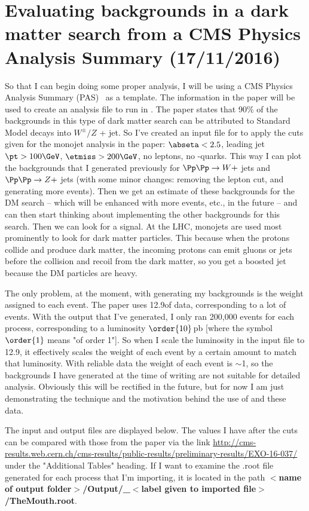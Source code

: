 
\chapter{Evaluating backgrounds in a dark matter search from a CMS Physics Analysis Summary (17/11/2016)}

So that I can begin doing some proper analysis, I will be using a CMS Physics Analysis Summary (PAS)~\cite{CMS:2016pod} as a template. The information in the paper will be used to create an analysis file to run in \madanalysis. The paper states that 90\% of the backgrounds in this type of dark matter search can be attributed to Standard Model decays into $W^{\pm} / Z$ + jet. So I've created an input file for \madanalysis to apply the cuts given for the monojet analysis in the paper: $\abseta < 2.5$, leading jet $\pt > 100\GeV$, $\etmiss > 200\GeV$, no leptons, no \Pqb-quarks. This way I can plot the backgrounds that I generated previously for $\Pp\Pp \rightarrow W +$ jets and $\Pp\Pp \rightarrow Z +$ jets (with some minor changes: removing the lepton \pt cut, and generating more events). Then we get an estimate of these backgrounds for the DM search -- which will be enhanced with more events, etc., in the future -- and can then start thinking about implementing the other backgrounds for this search. Then we can look for a signal. At the LHC, monojets are used most prominently to look for dark matter particles. This because when the protons collide and produce dark matter, the incoming protons can emit gluons or jets before the collision and recoil from the dark matter, so you get a boosted jet because the DM particles are heavy.

The only problem, at the moment, with generating my backgrounds is the weight assigned to each event. The paper uses 12.9\fbinv of data, corresponding to a lot of events. With the \madgraph output that I've generated, I only ran 200,000 events for each process, corresponding to a luminosity $\order{10}$\,pb [where the symbol $\order{1}$ means "of order 1"]. So when I scale the luminosity in the \madanalysis input file to 12.9\fbinv, it effectively scales the weight of each event by a certain amount to match that luminosity. With reliable data the weight of each event is $\sim$1, so the backgrounds I have generated at the time of writing are not suitable for detailed analysis. Obviously this will be rectified in the future, but for now I am just demonstrating the technique and the motivation behind the use of \madanalysis and these data.

The input and output files are displayed below. The values I have after the cuts can be compared with those from the paper via the link \url{http://cms-results.web.cern.ch/cms-results/public-results/preliminary-results/EXO-16-037/} under the "Additional Tables" heading. If I want to examine the .root file generated for each process that I'm importing, it is located in the path \textbf{$<$name of output folder$>$/Output/\_$<$label given to imported file$>$/TheMouth.root}.

